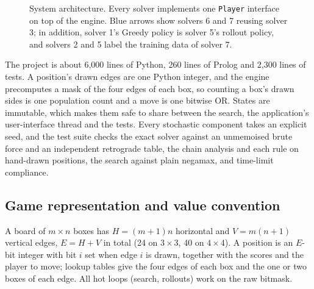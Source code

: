 \documentclass[11pt,a4paper]{article}
\newcommand{\bd}[2]{$#1{\times}#2$}            %
\newcommand{\code}[1]{\texttt{#1}}
\begin{document}
\begin{figure}[htbp]
\caption{System architecture. Every solver implements one \code{Player} interface on top of the
engine. Blue arrows show solvers 6 and 7 reusing solver 3; in addition, solver 1's Greedy policy is
solver 5's rollout policy, and solvers 2 and 5 label the training data of solver 7.}
\label{fig:arch}
\end{figure}

The project is about 6{,}000 lines of Python, 260 lines of Prolog and 2{,}300 lines of
tests. A position's drawn edges are one Python integer, and the engine
precomputes a mask of the four edges of each box, so counting a box's drawn sides is one
population count and a move is one bitwise OR. States are immutable, which makes them
safe to share between the search, the application's user-interface thread and the tests.
Every stochastic component takes an explicit seed, and the test suite checks the exact
solver against an unmemoised brute force and an independent retrograde table, the chain
analysis and each rule on hand-drawn positions, the search against plain negamax, and
time-limit compliance.

\subsection{Game representation and value convention}

A board of $m\times n$ boxes has $H=(m+1)n$ horizontal and $V=m(n+1)$ vertical edges,
$E=H+V$ in total (24 on \bd{3}{3}, 40 on \bd{4}{4}). A position is an $E$-bit integer
with bit $i$ set when edge $i$ is drawn, together with the scores and the player to move;
lookup tables give the four edges of each box and the one or two boxes of each edge. All
hot loops (search, rollouts) work on the raw bitmask.
\end{document}
